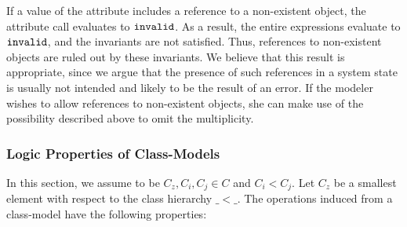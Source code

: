 If a value of the attribute  includes a reference to a non-existent
object, the attribute call evaluates to $\mathtt{invalid}$. As a result, the
entire expressions evaluate to $\mathtt{invalid}$, and the invariants are not
satisfied. Thus, references to non-existent objects are ruled out by these
invariants. We believe that this result is appropriate, since we argue that the
presence of such references in a system state is usually not intended and likely
to be the result of an error. If the modeler wishes to allow references to
non-existent objects, she can make use of the possibility described above to
omit the multiplicity.

\subsubsection{Logic Properties of Class-Models}\label{sec:logicprop-datamodel}
In this section, we assume to be $C_z,C_i,C_j \in C$ and  $C_i < C_j$.
Let $C_z$ be a smallest element with respect to the class hierarchy $\_ < \_$.
The operations induced from a class-model have the following properties:
